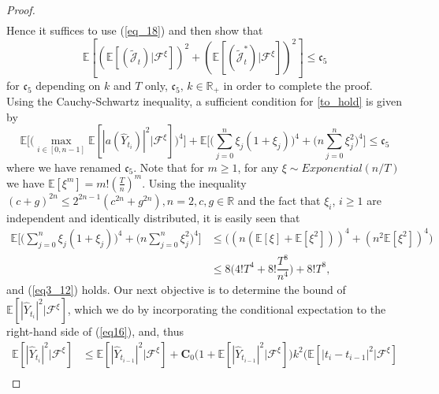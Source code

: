 \begin{proof}
\begin{equation}
\begin{split}
    \end{split}
\end{equation}
Hence it suffices to use (\ref{eq_18}) and then show that 
\begin{equation}\label{to_hold}
  \mathbb{E}[(\mathbb{E}[(\tilde{\mathcal{J}}_t)|\mathcal{F}^{\xi}])^2 + (\mathbb{E}[(\tilde{\mathcal{J}}^{*}_t) |\mathcal{F}^{\xi}])^2] \leq \mathfrak{c}_5
\end{equation}
for $\mathfrak{c}_5$ depending on $k$ and $T$ only, $\mathfrak{c}_5, \, k \in \mathbb{R}_+$ in order to complete the proof. Using the Cauchy-Schwartz inequality, a sufficient condition for \eqref{to_hold} is given by 
\begin{equation}\label{eq3_12}
   \mathbb{E} \Bigg[\bigg(\max_{i \in [0, n-1]} \mathbb{E}[|a(\hat{Y}_{t_{i}})|^2 |\mathcal{F}^{\xi}]\bigg)^4\Bigg] + \mathbb{E} \Bigg[\bigg(\sum_{j=0}^{n} \xi_{j} (1 + \xi_{j})\bigg)^4 + \bigg( n \sum_{j=0}^{n} \xi_{j}^2\bigg)^4\Bigg]\leq \mathfrak{c}_5
\end{equation}
where we have renamed $\mathfrak{c}_5$. Note that for ${m \geq 1}$, for any  $\xi \sim Exponential(n/T)$ we have $\mathbb{E}[\xi^m] = m! (\frac{T}{n})^m$. Using the inequality $(c + g)^{2n} \leq 2^{2n-1}(c^{2n} + g^{2n}), n=2, c,g \in \mathbb{R}$ and the fact that $\xi_i$, $i \geq 1$ are independent and identically distributed, it is easily seen that
\begin{equation}\label{eq3_13}
    \begin{split}
        \mathbb{E} \Bigg[\bigg(\sum_{j=0}^{n} \xi_{j} (1 + \xi_{j})\bigg)^4 + \bigg( n \sum_{j=0}^{n} \xi_{j}^2\bigg)^4\Bigg] 
        &\leq \big((n(\mathbb{E}[\xi] + \mathbb{E}[\xi^2]))^4 + (n^2\mathbb{E}[\xi^2])^4 \big)\\
        &\leq 8 \bigg(4!T^4 + 8!\dfrac{T^8}{n^4}\bigg) + 8!T^8,
   \end{split}
\end{equation}
and (\ref{eq3_12}) holds.
Our next objective is to determine the bound of  $\mathbb{E}[|\hat{Y}_{t_{i}}|^2 |\mathcal{F}^{\xi}]$, which we do by incorporating the conditional expectation to the right-hand side of (\ref{eq16}), and, thus
\begin{align}
        \mathbb{E}[|\hat{Y}_{t_i}|^2|\mathcal{F}^{\xi}] 
        &\leq \mathbb{E}[|\hat{Y}_{t_{i-1}}|^2|\mathcal{F}^{\xi}] + \mathbf{C}_0 \big(1 + \mathbb{E}[|\hat{Y}_{t_{i-1}}|^2|\mathcal{F}^{\xi}] \big) k^2 \big( \mathbb{E} [|t_{i} - t_{i-1}|^2|\mathcal{F}^{\xi}] \nonumber \\

\end{align}
\end{proof}
